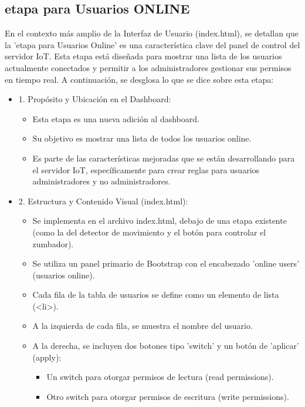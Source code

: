 \documentclass{report}
\begin{document}
\subsection{etapa para Usuarios ONLINE}
En el contexto más amplio de la Interfaz de Usuario (index.html), se  detallan que la 'etapa para Usuarios Online' es una 
característica clave del panel de control del servidor IoT. Esta etapa está diseñada para mostrar una lista de los usuarios actualmente 
conectados y permitir a los administradores gestionar sus permisos en tiempo real.
A continuación, se desglosa lo que se  dice sobre esta etapa:
\begin{itemize}
    \item 1. Propósito y Ubicación en el Dashboard:
        \begin{itemize}
            \item Esta etapa es una nueva adición al dashboard.
            \item Su objetivo es mostrar una lista de todos los usuarios online.
            \item Es parte de las características mejoradas que se están desarrollando para el servidor IoT, específicamente para crear reglas para 
            usuarios administradores y no administradores.
        \end{itemize}
    \item 2. Estructura y Contenido Visual (index.html):
        \begin{itemize}
            \item Se implementa en el archivo index.html, debajo de una etapa existente (como la del detector de movimiento y el botón para 
            controlar el zumbador).
            \item Se utiliza un panel primario de Bootstrap con el encabezado 'online users' (usuarios online).
            \item Cada fila de la tabla de usuarios se define como un elemento de lista (<li>).
            \item A la izquierda de cada fila, se muestra el nombre del usuario.
            \item A la derecha, se incluyen dos botones tipo 'switch' y un botón de 'aplicar' (apply):
                \begin{itemize}
                    \item Un switch para otorgar permisos de lectura (read permissions).
                    \item Otro switch para otorgar permisos de escritura (write permissions).

\end{itemize}
\end{itemize}
\end{itemize}
\end{document}
